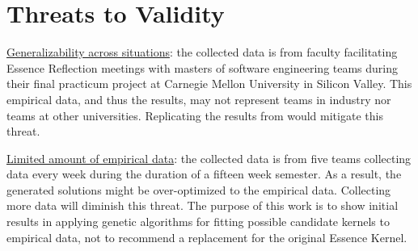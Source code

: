 \documentclass[preprint,12pt,3p]{elsarticle}
\begin{document}





\section{Threats to Validity}

\underline{Generalizability across situations}: the collected data is from faculty facilitating Essence Reflection meetings \cite{EASE2014} with masters of software engineering teams during their final practicum project at Carnegie Mellon University in Silicon Valley. This empirical data, and thus the results, may not represent teams in industry nor teams at other universities. Replicating the results from \cite{ICSE2014} would mitigate this threat.

\underline{Limited amount of empirical data}: the collected data is from five teams collecting data every week during the duration of a fifteen week semester. As a result, the generated solutions might be over-optimized to the empirical data. Collecting more data will diminish this threat. The purpose of this work is to show initial results in applying genetic algorithms for fitting possible candidate kernels to empirical data, not to recommend a replacement for the original Essence Kernel. 
\end{document}

